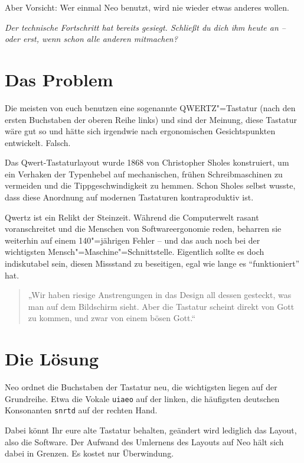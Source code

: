 \documentclass[%
  a4paper
  ,ngerman
  ,notumble,12pt,
]{leaflet}
\begin{document}
Aber Vorsicht: Wer einmal Neo benutzt, wird nie wieder etwas anderes wollen.

\emph{Der technische Fortschritt hat bereits gesiegt. Schließt du dich ihm heute an – oder erst, wenn schon alle anderen mitmachen?}

\newpage
\section{Das Problem}

Die meisten von euch benutzen eine sogenannte QWERTZ"=Tastatur (nach den ersten Buchstaben der oberen Reihe links) und sind der Meinung, diese Tastatur wäre gut so und hätte sich irgendwie nach ergonomischen Gesichtspunkten entwickelt. Falsch.

Das Qwert-Tastaturlayout wurde 1868 von Christopher Sholes konstruiert, um ein Verhaken der Typenhebel auf mechanischen, frühen Schreibmaschinen zu vermeiden und die Tippgeschwindigkeit zu hemmen. Schon Sholes selbst wusste, dass diese Anordnung auf modernen Tastaturen kontraproduktiv ist.

Qwertz ist ein Relikt der Steinzeit. Während die Computerwelt rasant voranschreitet und die Menschen von Softwareergonomie reden, beharren sie weiterhin auf einem 140"=jährigen Fehler – und das auch noch bei der wichtigsten Mensch"=Maschine"=Schnittstelle. Eigentlich sollte es doch indiskutabel sein, diesen Missstand zu beseitigen, egal wie lange es \enquote{funktioniert} hat.

\begin{quotation}
„Wir haben riesige Anstrengungen in das Design all dessen gesteckt, was man auf dem Bildschirm sieht. Aber die Tastatur scheint direkt von Gott zu kommen, und zwar von einem bösen Gott.“\\
\end{quotation}

\newpage
\section{Die Lösung}
Neo ordnet die Buchstaben der Tastatur neu, die wichtigsten liegen auf der Grundreihe. Etwa die Vokale \texttt{uiaeo} auf der linken, die
häufigsten deutschen Konsonanten \texttt{snrtd} auf der rechten Hand.

Dabei könnt Ihr eure alte Tastatur behalten, geändert wird lediglich das Layout, also die Software. Der Aufwand des Umlernens des Layouts auf Neo hält sich dabei in Grenzen. Es kostet nur Überwindung.
\end{document}

